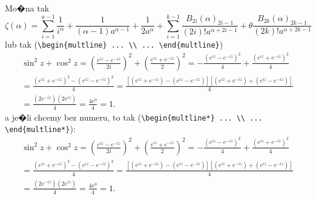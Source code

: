 \documentclass[11pt,wide]{mwart}
\begin{document}
Mo�na tak
\begin{equation}
\zeta(\alpha)=\sum_{i=1}^{a-1}\frac{1}{i^\alpha}+\frac{1}{(\alpha-1)
a^{\alpha-1}}+\frac{1}{2a^\alpha}+\sum_{i=1}^{k-1}\frac{B_{2i}
(\alpha)_{2i-1}}{(2i)!a^{\alpha+2i-1}}+\theta\frac{B_{2k}(\alpha)_{2k-1}}
{(2k)!a^{\alpha+2k-1}}
\end{equation}
lub tak (\verb+\begin{multline} ... \\ ... \end{multline}+)
\begin{multline}
	\sin^2z+\cos^2z=\left(\frac{e^{iz}-e^{-iz}}{2i}\right)^2+
	\left(\frac{e^{iz}+e^{-iz}}{2}\right)^2=-
	\frac{(e^{iz}-e^{-iz})^2}{4}+\frac{(e^{iz}+e^{-iz})^2}{4}\\
	=\frac{(e^{iz}+e^{-iz})^2-(e^{iz}-e^{-iz})^2}{4}=
	\frac{\left[\left(e^{iz}+e^{-iz}\right)-
	\left(e^{iz}-e^{-iz}\right)\right]
	\left[\left(e^{iz}+e^{-iz}\right)+
	\left(e^{iz}-e^{-iz}\right)\right]}{4}\\
	=\frac{\left(2e^{-iz}\right)\left(2e^{iz}\right)}{4}=\frac{4e^{0}}{4}=1.
\end{multline}
a je�li chcemy bez numeru, to tak
(\verb+\begin{multline*} ... \\ ... \end{multline*}+):
\begin{multline*}
	\sin^2z+\cos^2z=\left(\frac{e^{iz}-e^{-iz}}{2i}\right)^2+
	\left(\frac{e^{iz}+e^{-iz}}{2}\right)^2=-
	\frac{(e^{iz}-e^{-iz})^2}{4}+\frac{(e^{iz}+e^{-iz})^2}{4}\\
	=\frac{(e^{iz}+e^{-iz})^2-(e^{iz}-e^{-iz})^2}{4}=
	\frac{\left[\left(e^{iz}+e^{-iz}\right)-
	\left(e^{iz}-e^{-iz}\right)\right]\left[\left(e^{iz}+e^{-iz}\right)+
	\left(e^{iz}-e^{-iz}\right)\right]}{4}\\
	=\frac{\left(2e^{-iz}\right)\left(2e^{iz}\right)}{4}=\frac{4e^{0}}{4}=1.
\end{multline*}
\end{document}
